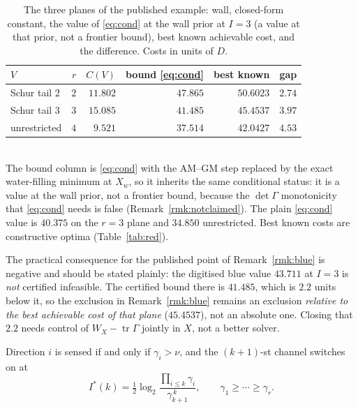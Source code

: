 \begin{table}[h]
 \centering\caption{The three planes of the published example: wall, closed-form
 constant, the value of \eqref{eq:cond} at the wall prior at $I=3$ (a value at
 that prior, not a frontier bound), best known achievable cost, and the
 difference. Costs in units of $D$.}
 \label{tab:bound}
 \begin{tabularx}{\columnwidth}{Xrrrrr}
 \hline
 $V$ & $r$ & $C(V)$ & bound \eqref{eq:cond} & best known & gap \\
 \hline
 Schur tail $2$ & $2$ & $11.802$ & $47.865$ & $50.6023$ & $2.74$ \\
 Schur tail $3$ & $3$ & $15.085$ & $41.485$ & $45.4537$ & $3.97$ \\
 unrestricted & $4$ & $9.521$ & $37.514$ & $42.0427$ & $4.53$ \\
 \hline
 \end{tabularx}
 \\[1pt]{\scriptsize The bound column is \eqref{eq:cond} with the
 $\mathrm{AM}$--$\mathrm{GM}$ step replaced by the exact water-filling minimum
 at $X_w$, so it inherits the same conditional status: it is a value at the wall
 prior, not a frontier bound, because the $\det\Gamma$ monotonicity that
 \eqref{eq:cond} needs is false (Remark~\ref{rmk:notclaimed}). The plain
 \eqref{eq:cond} value is $40.375$ on the $r=3$ plane and $34.850$
 unrestricted. Best known costs are constructive optima
 (Table~\ref{tab:red}).}
\end{table}

The practical consequence for the published point of Remark~\ref{rmk:blue} is
negative and should be stated plainly: the digitised blue value $43.711$ at $I=3$
is \emph{not} certified infeasible. The certified bound there is $41.485$, which
is $2.2$ units below it, so the exclusion in Remark~\ref{rmk:blue} remains an
exclusion \emph{relative to the best achievable cost of that plane}
($45.4537$), not an absolute one. Closing that $2.2$ needs control of
$W_X-\operatorname{tr}\Gamma$ jointly in $X$, not a better solver.

\begin{proposition}
\label{pr:switch}
Direction $i$ is sensed if and only if $\gamma_i>\nu$, and the $(k{+}1)$-st
channel switches on at
\begin{equation}
 I^*(k)=\tfrac12\log_2\frac{\prod_{i\le k}\gamma_i}{\gamma_{k+1}^{\,k}},
 \qquad \gamma_1\ge\cdots\ge\gamma_r.
\label{eq:istar}
\end{equation}
\end{proposition}

